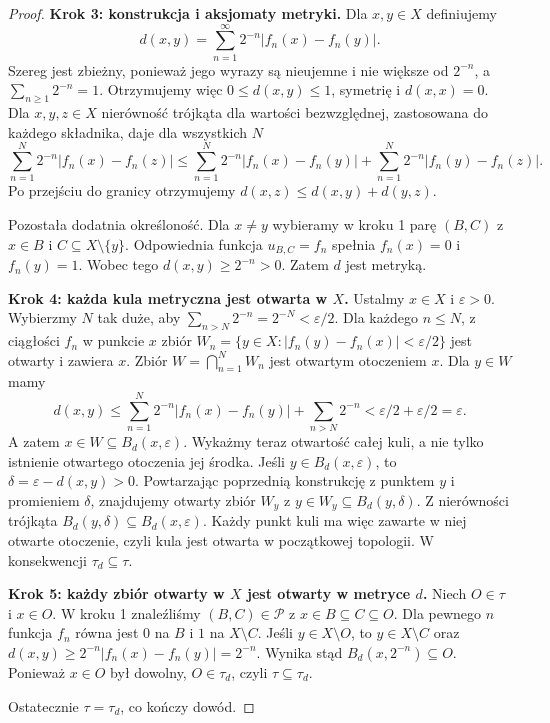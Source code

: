 \begin{proof}
\textbf{Krok 3: konstrukcja i aksjomaty metryki.}
Dla $x,y\in X$ definiujemy
\[
 d(x,y)=\sum_{n=1}^{\infty}2^{-n}|f_n(x)-f_n(y)|.
\]
Szereg jest zbieżny, ponieważ jego wyrazy są
nieujemne i nie większe od $2^{-n}$, a
$\sum_{n\ge1}2^{-n}=1$. Otrzymujemy więc
$0\le d(x,y)\le1$, symetrię i $d(x,x)=0$.
Dla $x,y,z\in X$ nierówność trójkąta dla wartości
bezwzględnej, zastosowana do każdego składnika,
daje dla wszystkich $N$
\[
\sum_{n=1}^{N}2^{-n}|f_n(x)-f_n(z)|
\le\sum_{n=1}^{N}2^{-n}|f_n(x)-f_n(y)|
+\sum_{n=1}^{N}2^{-n}|f_n(y)-f_n(z)|.
\]
Po przejściu do granicy otrzymujemy
$d(x,z)\le d(x,y)+d(y,z)$.

Pozostała dodatnia określoność. Dla $x\ne y$
wybieramy w kroku 1 parę $(B,C)$ z
$x\in B$ i $C\subseteq X\setminus\{y\}$.
Odpowiednia funkcja $u_{B,C}=f_n$ spełnia
$f_n(x)=0$ i $f_n(y)=1$. Wobec tego
$d(x,y)\ge2^{-n}>0$. Zatem $d$ jest metryką.

\textbf{Krok 4: każda kula metryczna jest otwarta w $X$.}
Ustalmy $x\in X$ i $\varepsilon>0$. Wybierzmy $N$
tak duże, aby $\sum_{n>N}2^{-n}=2^{-N}<\varepsilon/2$.
Dla każdego $n\le N$, z ciągłości $f_n$ w punkcie $x$
zbiór
$W_n=\{y\in X:|f_n(y)-f_n(x)|<\varepsilon/2\}$
jest otwarty i zawiera $x$. Zbiór
$W=\bigcap_{n=1}^{N}W_n$ jest otwartym otoczeniem $x$.
Dla $y\in W$ mamy
\[
 d(x,y)\le\sum_{n=1}^{N}2^{-n}|f_n(x)-f_n(y)|
+\sum_{n>N}2^{-n}<\varepsilon/2+\varepsilon/2
=\varepsilon.
\]
A zatem $x\in W\subseteq B_d(x,\varepsilon)$.
Wykażmy teraz otwartość całej kuli, a nie tylko istnienie
otwartego otoczenia jej środka. Jeśli
$y\in B_d(x,\varepsilon)$, to
$\delta=\varepsilon-d(x,y)>0$. Powtarzając poprzednią
konstrukcję z punktem $y$ i promieniem $\delta$,
znajdujemy otwarty zbiór $W_y$ z
$y\in W_y\subseteq B_d(y,\delta)$.
Z nierówności trójkąta
$B_d(y,\delta)\subseteq B_d(x,\varepsilon)$.
Każdy punkt kuli ma więc zawarte w niej otwarte
otoczenie, czyli kula jest otwarta w początkowej
topologii. W konsekwencji $\tau_d\subseteq\tau$.

\pagebreak[4]
\textbf{Krok 5: każdy zbiór otwarty w $X$ jest otwarty
w metryce $d$.}
Niech $O\in\tau$ i $x\in O$. W kroku 1 znaleźliśmy
$(B,C)\in\mathcal P$ z $x\in B\subseteq C\subseteq O$.
Dla pewnego $n$ funkcja $f_n$ równa jest $0$ na $B$
i $1$ na $X\setminus C$. Jeśli $y\in X\setminus O$,
to $y\in X\setminus C$ oraz
$d(x,y)\ge2^{-n}|f_n(x)-f_n(y)|=2^{-n}$.
Wynika stąd
$B_d(x,2^{-n})\subseteq O$.
Ponieważ $x\in O$ był dowolny, $O\in\tau_d$,
czyli $\tau\subseteq\tau_d$.

Ostatecznie $\tau=\tau_d$, co kończy dowód.
\end{proof}


